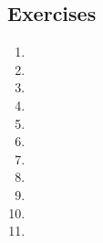 \subsection*{Exercises}

\begin{enumerate}
    \item
    \item
    \item
    \item
    \item
    \item
    \item
    \item
    \item
    \item
    \item
\end{enumerate}
